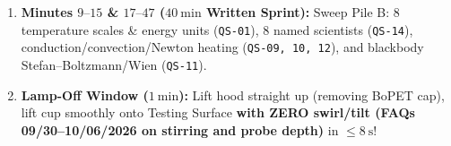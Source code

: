 \begin{formulacard}
\begin{twocol}[0.485]
\begin{enumerate}
  \item \textbf{Minutes $9\text{--}15$ \& $17\text{--}47$ ($\SI{40}{\minute}$ Written Sprint):} Sweep Pile B: 8 temperature scales \& energy units (\texttt{QS-01}), 8 named scientists (\texttt{QS-14}), conduction/convection/Newton heating (\texttt{QS-09, 10, 12}), and blackbody Stefan--Boltzmann/Wien (\texttt{QS-11}).
  \item \textbf{Lamp-Off Window ($\SI{1}{\minute}$):} Lift hood straight up (removing BoPET cap), lift cup smoothly onto Testing Surface \textbf{with ZERO swirl/tilt (FAQs 09/30--10/06/2026 on stirring and probe depth)} in $\le \SI{8}{\second}$!
\end{enumerate}
\end{twocol}
\end{formulacard}

